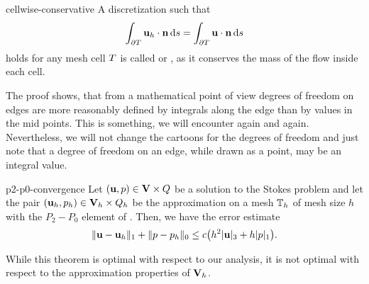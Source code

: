 \begin{Definition}{cellwise-conservative}
  A discretization such that
  \begin{gather}
    \int_{\partial T} \mathbf u_h\cdot\mathbf n \,\mathrm{d} s = \int_{\partial T} \mathbf u\cdot \mathbf n \,\mathrm{d} s
  \end{gather}
  holds for any mesh cell $T$ is called  or , as it conserves
  the mass of the flow inside each cell.
\end{Definition}

\begin{remark}
  The proof shows, that from a mathematical point of view degrees of
  freedom on edges are more reasonably defined by integrals along the
  edge than by values in the mid points. This is something, we will
  encounter again and again. Nevertheless, we will not change the
  cartoons for the degrees of freedom and just note that a degree of
  freedom on an edge, while drawn as a point, may be an integral value.
\end{remark}

\begin{Theorem}{p2-p0-convergence}
  Let $(\mathbf u,p)\in \mathbf V\times Q$ be a solution to the Stokes problem and let
  the pair $(\mathbf u_h,p_h) \in \mathbf V_h\times Q_h$ be the approximation on a
  mesh $\mathbb T_h$ of mesh size $h$ with the $P_2-P_0$ element of
  . Then, we have the error
  estimate
  \begin{gather}
    \lVert\mathbf u-\mathbf u_h\rVert_1 + \lVert p-p_h\rVert_0
    \le c \bigl(h^2\lvert\mathbf u\rvert_3 + h \lvert p\rvert_1\bigr).
  \end{gather}
\end{Theorem}

\begin{remark}
  While this theorem is optimal with respect to our analysis, it is
  not optimal with respect to the approximation properties of $\mathbf V_h$.
\end{remark}

